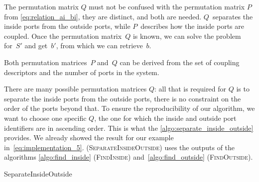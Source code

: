 The permutation matrix $Q$ must not be confused with the permutation matrix $P$ from \cref{eq:relation_ai_bi}, they are distinct, and both are needed.
$Q$~separates the inside ports from the outside ports, while $P$~describes how the inside ports are coupled.
Once the permutation matrix~$Q$ is known, we can solve the problem for~$S'$ and get~$b'$, from which we can retrieve~$b$.

Both permutation matrices~$P$ and~$Q$ can be derived from the set of coupling descriptors and the number of ports in the system.

There are many possible permutation matrices $Q$: all that is required for $Q$ is to separate the inside ports from the outside ports, there is no constraint on the order of the ports beyond that.
To ensure the reproducibility of our algorithm, we want to choose one specific $Q$, the one for which the inside and outside port identifiers are in ascending order.
This is what the \cref{algo:separate_inside_outside} provides.
We already showed the result for our example in~\cref{eq:implementation_5}.
 (\textsc{SeparateInsideOutside})
uses the outputs of the algorithms \ref{algo:find_inside} (\textsc{FindInside}) and~\ref{algo:find_outside} (\textsc{FindOutside}).

\begin{algorithm}
    \caption{SeparateInsideOutside}
    \label{algo:separate_inside_outside}
    \begin{algorithmic}
         
         
         
         
        \EndFor
        \EndFor
        \\  
        \EndFunction
    \end{algorithmic}
\end{algorithm}

